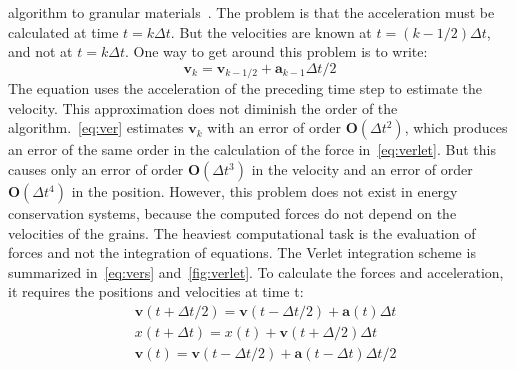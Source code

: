 algorithm to 
granular materials~\citep{Radjai2011}. The problem is that the acceleration 
must be calculated at 
time $t=k\Delta t$. But the velocities are known at $t=(k - 1/2) \Delta t$, 
and not at $t=k \Delta 
t$. One way to get around this problem is to write:
%
\begin{equation} 
\mathbf{v}_{\mathit{k}}={\mathbf{v}_{\mathit{k}-1/2}+{\mathbf{a}_{\mathit{k}-1}\Delta
 t/2}}
\label{eq:ver}
\end{equation}
%
The equation uses the acceleration of the preceding time step to estimate the 
velocity. This 
approximation does not diminish the order of the algorithm.~\cref{eq:ver} 
estimates 
$\mathbf{v}_{k}$ with an error of order $\mathbf{O}(\Delta t^{2})$, which 
produces an error of the 
same order in the calculation of the force in~\cref{eq:verlet}. But this 
causes only an error of 
order $\mathbf{O}(\Delta t^{3})$ in the velocity and an error of order 
$\mathbf{O}(\Delta t^{4})$ 
in the position. However, this problem does not exist in energy conservation 
systems, because the 
computed forces do not depend on the velocities of the grains. The heaviest 
computational task is 
the evaluation of forces and not the integration of equations. The Verlet 
integration scheme is 
summarized in~\cref{eq:vers} and~\cref{fig:verlet}. To calculate the forces 
and 
acceleration, it requires the positions and velocities at time t:
%
\begin{align}
& \mathbf{v}(t+\Delta t/2)=\mathbf{v}(t-\Delta t/2) + \mathbf{a}(t) \Delta t 
\nonumber \\
& x(t+\Delta t)=x(t)+\mathbf{v}(t+\Delta /2) \Delta t \nonumber \\
& \mathbf{v}(t)=\mathbf{v}(t-\Delta t /2)+\mathbf{a}(t- \Delta t) \Delta t /2
\label{eq:vers}
\end{align}

